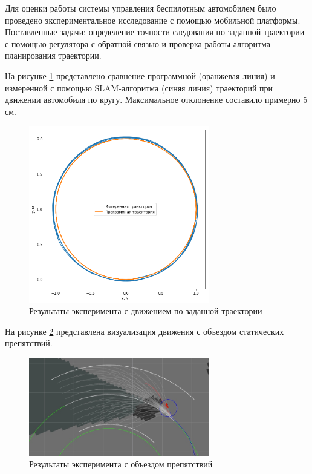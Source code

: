 Для оценки работы системы управления беспилотным автомобилем было проведено экспериментальное исследование
с помощью мобильной платформы. Поставленные задачи: определение точности следования по заданной траектории
с помощью регулятора с обратной связью и проверка работы алгоритма планирования траектории.

На рисунке \ref{img:path_moving_test} представлено сравнение программной (оранжевая линия)
и измеренной с помощью SLAM-алгоритма (синяя линия) траекторий при движении автомобиля по кругу.
Максимальное отклонение составило примерно 5 см.

\begin{figure}[h]
    \centering
    \includegraphics[width=0.7\textwidth]{images/path_moving_test}
    \caption{Результаты эксперимента с движением по заданной траектории}
    \label{img:path_moving_test}
\end{figure}

На рисунке \ref{img:obstacle_avoidance} представлена визуализация движения с объездом статических
препятствий.

\begin{figure}[h]
    \centering
    \includegraphics[width=0.7\textwidth]{images/obstacle_avoidance}
    \caption{Результаты эксперимента с объездом препятствий}
    \label{img:obstacle_avoidance}
\end{figure}

